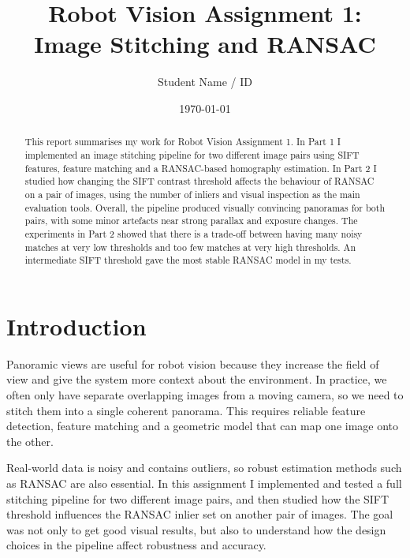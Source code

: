\documentclass{Resources/UoBLab1}
\begin{document}

\title{Robot Vision Assignment 1:\\Image Stitching and RANSAC}
\author{Student Name / ID}
\date{\today}

\maketitle

\begin{abstract}
This report summarises my work for Robot Vision Assignment 1.
In Part 1 I implemented an image stitching pipeline for two different image pairs using SIFT features, feature matching and a RANSAC-based homography estimation.
In Part 2 I studied how changing the SIFT contrast threshold affects the behaviour of RANSAC on a pair of images, using the number of inliers and visual inspection as the main evaluation tools.
Overall, the pipeline produced visually convincing panoramas for both pairs, with some minor artefacts near strong parallax and exposure changes.
The experiments in Part 2 showed that there is a trade-off between having many noisy matches at very low thresholds and too few matches at very high thresholds.
An intermediate SIFT threshold gave the most stable RANSAC model in my tests.
\end{abstract}

\section{Introduction}

Panoramic views are useful for robot vision because they increase the field of view and give the system more context about the environment.
In practice, we often only have separate overlapping images from a moving camera, so we need to stitch them into a single coherent panorama.
This requires reliable feature detection, feature matching and a geometric model that can map one image onto the other.

Real-world data is noisy and contains outliers, so robust estimation methods such as RANSAC are also essential.
In this assignment I implemented and tested a full stitching pipeline for two different image pairs, and then studied how the SIFT threshold influences the RANSAC inlier set on another pair of images.
The goal was not only to get good visual results, but also to understand how the design choices in the pipeline affect robustness and accuracy.
\end{document}
